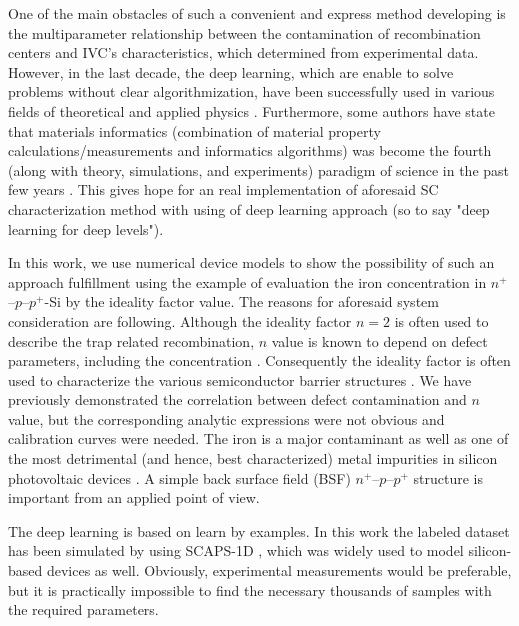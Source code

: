 \documentclass[journal]{IEEEtran}
\begin{document}
One of the main obstacles of such a convenient and express method developing is the multiparameter relationship between the contamination of recombination centers and IVC's characteristics, which determined from experimental data.
However, in the last decade, the deep learning, which are enable to solve problems without clear algorithmization, have been successfully used in various fields of theoretical and applied physics \cite{MachLean_RevModPhys,MachLeanJAP,MachLeanPPV}.
Furthermore, some authors have state that materials informatics
(combination of material property calculations/measurements and informatics algorithms)
was become the fourth (along with theory, simulations, and experiments) paradigm of science in the past few years \cite{MI_JAP}.
This gives hope for an real implementation of aforesaid SC characterization method with using of deep learning approach (so to say "deep learning for deep levels").

In this work, we use numerical device models to show the possibility of such an approach fulfillment using the example of evaluation the iron concentration in $n^+$--$p$--$p^+$-Si by the ideality factor value.
The reasons for aforesaid system consideration are following.
Although the ideality factor $n=2$ is often used to describe the trap related recombination, $n$ value is known to depend on defect parameters, including the concentration \cite{n2_Beier,n2McIntosh,n2Kaminski,HAMEIRI2013251,Heide}.
Consequently the ideality factor is often used to characterize the various
semiconductor barrier structures \cite{Heide,Duan,n_CharGaN,n_CharSemic,n_CharPhysRevAppl,BulyarJAP}.
We have previously demonstrated \cite{Olikh2019SM} the correlation between defect contamination and $n$ value, but the corresponding analytic expressions were not obvious and calibration curves were needed.
The iron is a major contaminant as well as one of the most detrimental (and hence, best
characterized)
metal impurities in silicon photovoltaic devices \cite{HowMuchPhysics,FeB:Schmidt}.
A simple back surface field (BSF) $n^+$--$p$--$p^+$ structure is important from an applied point of view.


The deep learning is based on learn by examples.
In this work the labeled dataset has been simulated by using SCAPS-1D \cite{SCAPS1,SCAPS2}, which was widely used to model silicon-based devices \cite{SCAPSuseSi4,SCAPSuseSi1,SCAPSuseSi6} as well.
Obviously, experimental measurements would be preferable, but it is practically impossible to find the necessary thousands of samples with the required parameters.
\end{document}
